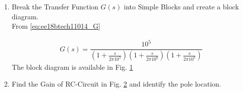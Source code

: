 \begin{enumerate}[label=\thesection.\arabic*.,ref=\thesection.\theenumi]
\item Break the Transfer Function $G(s)$ into Simple Blocks and create a block diagram.
\\
\solution From \eqref{eq:ee18btech11014_G}

\begin{align}
\label{eq:ee18btech11014_Gs}
	G(s) = \dfrac{10^{5}}{\left(1+\frac{s}{2\pi10^{5}}\right)\left(1+\frac{s}{2\pi10^{6}}\right)\left(1+\frac{s}{2\pi10^{7}}\right)}
\end{align}
%
The block diagram is available in 
Fig. 	\ref{fig:ee18btech11014_RC Circuit_block}
%
\begin{figure}[ht!]
	\begin{center}
		\resizebox{\columnwidth}{!}{}
	\end{center}
	\caption{}
	\label{fig:ee18btech11014_RC Circuit_block}
\end{figure}

\item Find the Gain of RC-Circuit in Fig. \ref{fig:ee18btech11014_RC Circuit} and identify the pole location.
\begin{figure}[ht!]
	\begin{center}
		\resizebox{\columnwidth/2}{!}{}
	\end{center}
	\caption{}
	\label{fig:ee18btech11014_RC Circuit}
\end{figure}


\end{enumerate}
